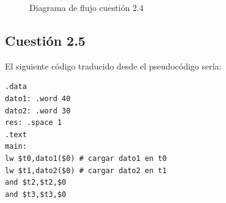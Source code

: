 \documentclass[11pt]{article}
\begin{document}
\begin{large}
\begin{flushleft}
\begin{figure}[H]
    \centering
    \caption{Diagrama de flujo cuestión 2.4}
    \label{fig:my_label}
\end{figure}


\subsection*{Cuestión 2.5}
El siguiente código traducido desde el pseudocódigo sería:
\begin{listing}[h]
\begin{verbatim}
.data
dato1: .word 40
dato2: .word 30
res: .space 1
.text
main: 
lw $t0,dato1($0) # cargar dato1 en t0
lw $t1,dato2($0) # cargar dato2 en t1
and $t2,$t2,$0
and $t3,$t3,$0


\end{verbatim}
\end{listing}
\end{flushleft}
\end{large}
\end{document}
